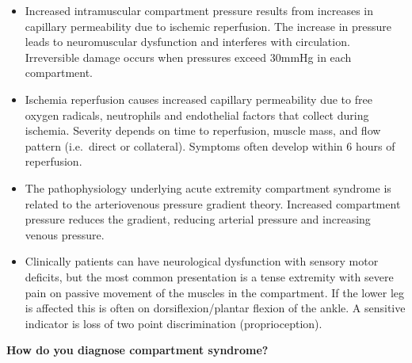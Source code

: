 \documentclass[
]{book}
\begin{document}
\begin{itemize}
\item
  Increased intramuscular compartment pressure results from increases
  in capillary permeability due to ischemic reperfusion. The increase
  in pressure leads to neuromuscular dysfunction and interferes with
  circulation. Irreversible damage occurs when pressures exceed 30mmHg
  in each compartment.~~
\item
  Ischemia reperfusion causes increased capillary permeability due to
  free oxygen radicals, neutrophils and endothelial factors that
  collect during ischemia. Severity depends on time to reperfusion,
  muscle mass, and flow pattern (i.e.~direct or collateral). Symptoms
  often develop within 6 hours of reperfusion. \citep{vonkeudell2015}
\item
  The pathophysiology underlying acute extremity compartment syndrome
  is related to the arteriovenous pressure gradient theory. Increased
  compartment pressure reduces the gradient, reducing arterial
  pressure and increasing venous pressure.\citep{frink2010, mcqueen1996, elliott2003, papalambros1989}
\item
  Clinically patients can have neurological dysfunction with sensory motor
  deficits, but the most common presentation is a tense extremity with
  severe pain on passive movement of the muscles in the compartment. If the
  lower leg is affected this is often on dorsiflexion/plantar flexion of the
  ankle. A sensitive indicator is loss of two point discrimination (proprioception).
\end{itemize}

\textbf{How do you diagnose compartment syndrome?}
\end{document}
